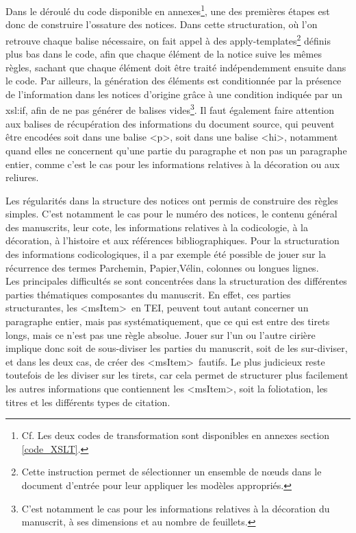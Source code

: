 \documentclass[a4paper,12pt,twoside]{book}
\begin{document}
Dans le déroulé du code disponible en annexes\footnote{Cf. Les deux codes de transformation sont disponibles en annexes section \ref{code_XSLT}.}, une des premières étapes est donc de construire l'ossature des notices. Dans cette structuration, où l'on retrouve chaque balise nécessaire, on fait appel à des apply-templates\footnote{Cette instruction permet de sélectionner un ensemble de nœuds dans le document d'entrée pour leur appliquer les modèles appropriés.} définis plus bas dans le code, afin que chaque élément de la notice suive les mêmes règles, sachant que chaque élément doit être traité indépendemment ensuite dans le code. Par ailleurs, la génération des éléments est conditionnée par la présence de l'information dans les notices d'origine grâce à une condition indiquée par un xsl:if, afin de ne pas générer de balises vides\footnote{C'est notamment le cas pour les informations relatives à la décoration du manuscrit, à ses dimensions et au nombre de feuillets.}. Il faut également faire attention aux balises de récupération des informations du document source, qui peuvent être encodées soit dans une balise \textless p\textgreater, soit dans une balise \textless hi\textgreater, notamment quand elles ne concernent qu'une partie du paragraphe et non pas un paragraphe entier, comme c'est le cas pour les informations relatives à la décoration ou aux reliures.

Les régularités dans la structure des notices ont permis de construire des règles simples. C'est notamment le cas pour le numéro des notices, le contenu général des manuscrits, leur cote, les informations relatives à la codicologie, à la décoration, à l'histoire et aux références bibliographiques. Pour la structuration des informations codicologiques, il a par exemple été possible de jouer sur la récurrence des termes \og Parchemin\fg{}, \og Papier\fg{},\og  Vélin\fg{}, \og colonnes\fg{} ou \og longues lignes\fg{}.\\

Les principales difficultés se sont concentrées dans la structuration des différentes parties thématiques composantes du manuscrit. En effet, ces parties structurantes, les \textless msItem\textgreater~en TEI, peuvent tout autant concerner un paragraphe entier, mais pas systématiquement, que ce qui est entre des tirets longs, mais ce n'est pas une règle absolue. Jouer sur l'un ou l'autre cirière implique donc soit de sous-diviser les parties du manuscrit, soit de les sur-diviser, et dans les deux cas, de créer des \textless msItem\textgreater~fautifs. Le plus judicieux reste toutefois de les diviser sur les tirets, car cela permet de structurer plus facilement les autres informations que contiennent les \textless msItem\textgreater, soit la foliotation, les titres et les différents types de citation.
\end{document}

